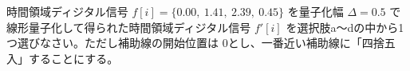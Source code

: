 時間領域ディジタル信号 $f[i] = \{0.00,\ 1.41,\ 2.39,\ 0.45 \}$ を量子化幅 $\Delta = 0.5$ で線形量子化して得られた時間領域ディジタル信号 $f'[i]$ を選択肢a〜dの中から1つ選びなさい。ただし補助線の開始位置は $0$とし、一番近い補助線に「四捨五入」することにする。
